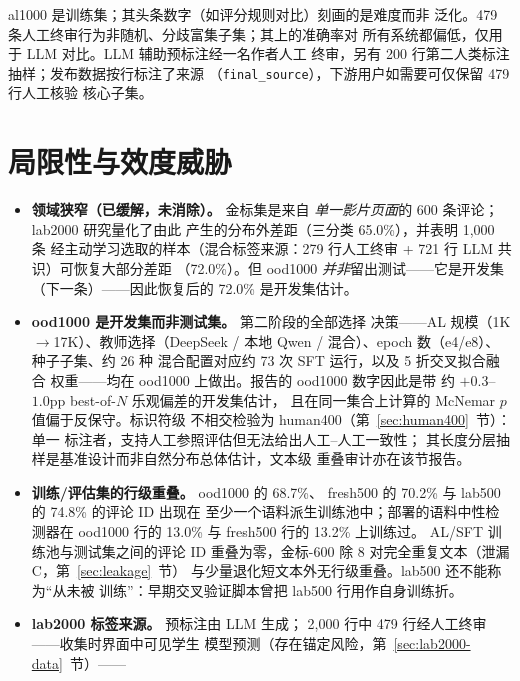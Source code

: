 \documentclass[11pt,a4paper]{article}
\newcommand{\code}[1]{\texttt{#1}}
\begin{document}
al1000 是训练集；其头条数字（如评分规则对比）刻画的是难度而非
泛化。479 条人工终审行为非随机、分歧富集子集；其上的准确率对
所有系统都偏低，仅用于 LLM 对比。LLM 辅助预标注经一名作者人工
终审，另有 200 行第二人类标注抽样；发布数据按行标注了来源
（\code{final\_source}），下游用户如需要可仅保留 479 行人工核验
核心子集。

\section{局限性与效度威胁}
\label{sec:limits}

\begin{itemize}
  \item \textbf{领域狭窄（已缓解，未消除）。} 金标集是来自
        \emph{单一影片页面}的 600 条评论；lab2000 研究量化了由此
        产生的分布外差距（三分类 65.0\%），并表明 1{,}000 条
        经主动学习选取的样本（混合标签来源：279 行人工终审 +
        721 行 LLM 共识）可恢复大部分差距
        （72.0\%）。但 ood1000 \emph{并非}留出测试——它是开发集
        （下一条）——因此恢复后的 72.0\% 是开发集估计。
  \item \textbf{ood1000 是开发集而非测试集。} 第二阶段的全部选择
        决策——AL 规模（1K$\to$17K）、教师选择（DeepSeek /
        本地 Qwen / 混合）、epoch 数（e4/e8）、种子子集、约 26 种
        混合配置对应约 73 次 SFT 运行，以及 5 折交叉拟合融合
        权重——均在 ood1000 上做出。报告的 ood1000 数字因此是带
        约 $+0.3$--$1.0$pp best-of-$N$ 乐观偏差的开发集估计，
        且在同一集合上计算的 McNemar $p$ 值偏于反保守。标识符级
        不相交检验为 human400（第~\ref{sec:human400}~节）：单一
        标注者，支持人工参照评估但无法给出人工--人工一致性；
        其长度分层抽样是基准设计而非自然分布总体估计，文本级
        重叠审计亦在该节报告。
  \item \textbf{训练/评估集的行级重叠。} ood1000 的 68.7\%、
        fresh500 的 70.2\% 与 lab500 的 74.8\% 的评论 ID 出现在
        至少一个语料派生训练池中；部署的语料中性检测器在
        ood1000 行的 13.0\% 与 fresh500 行的 13.2\% 上训练过。
        AL/SFT 训练池与测试集之间的评论 ID 重叠为零，金标-600
        除 8 对完全重复文本（泄漏 C，第~\ref{sec:leakage}~节）
        与少量退化短文本外无行级重叠。lab500 还不能称为“从未被
        训练”：早期交叉验证脚本曾把 lab500 行用作自身训练折。
  \item \textbf{lab2000 标签来源。} 预标注由 LLM 生成；
        2{,}000 行中 479 行经人工终审——收集时界面中可见学生
        模型预测（存在锚定风险，第~\ref{sec:lab2000-data}~节）——

\end{itemize}
\end{document}
